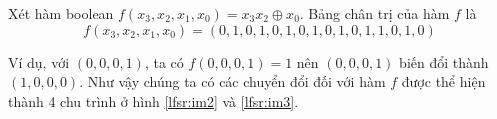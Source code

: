 \begin{example}
	Xét hàm boolean $f(x_3, x_2, x_1, x_0) = x_3 x_2 \oplus x_0$. Bảng chân trị của hàm $f$ là \[f(x_3, x_2, x_1, x_0) = (0, 1, 0, 1, 0, 1, 0, 1, 0, 1, 0, 1, 1, 0, 1, 0)\]
	
	Ví dụ, với $(0, 0, 0, 1)$, ta có $f(0, 0, 0, 1) = 1$ nên $(0, 0, 0, 1)$ biến đổi thành $(1, 0, 0, 0)$. Như vậy chúng ta có các chuyển đổi đối với hàm $f$ được thể hiện thành 4 chu trình ở hình \ref{lfsr:im2} và \ref{lfsr:im3}.
	
	
	
	

\end{example}
